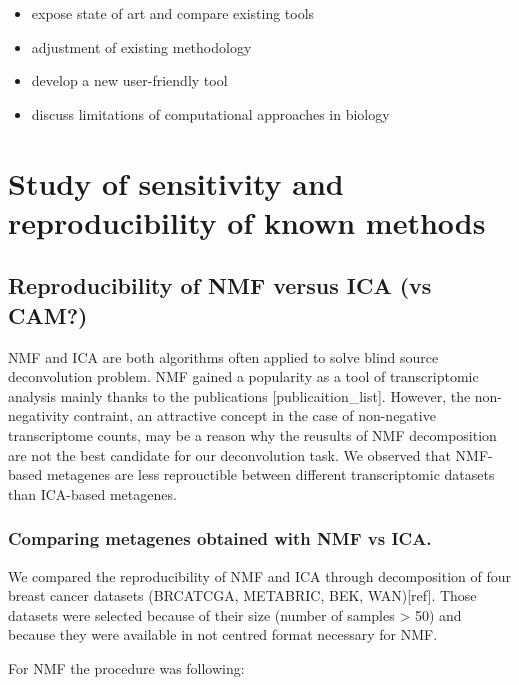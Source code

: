 \documentclass[12pt,]{book}
\providecommand{\tightlist}{%
  \setlength{\itemsep}{0pt}\setlength{\parskip}{0pt}}
\theoremstyle{definition}
\theoremstyle{definition}
\theoremstyle{definition}
\theoremstyle{remark}
\begin{document}
\begin{itemize}
\tightlist
\item
  expose state of art and compare existing tools
\item
  adjustment of existing methodology
\item
  develop a new user-friendly tool
\item
  discuss limitations of computational approaches in biology
\end{itemize}

\hypertarget{sens}{%
\chapter{Study of sensitivity and reproducibility of known
methods}\label{sens}}

\hypertarget{reproducibility-of-nmf-versus-ica-vs-cam}{%
\section{Reproducibility of NMF versus ICA (vs
CAM?)}\label{reproducibility-of-nmf-versus-ica-vs-cam}}

NMF and ICA are both algorithms often applied to solve blind source
deconvolution problem. NMF gained a popularity as a tool of
transcriptomic analysis mainly thanks to the publications
{[}publicaition\_list{]}. However, the non-negativity contraint, an
attractive concept in the case of non-negative transcriptome counts, may
be a reason why the reusults of NMF decomposition are not the best
candidate for our deconvolution task. We observed that NMF-based
metagenes are less reprouctible between different transcriptomic
datasets than ICA-based metagenes.

\hypertarget{comparing-metagenes-obtained-with-nmf-vs-ica.}{%
\subsection{Comparing metagenes obtained with NMF vs
ICA.}\label{comparing-metagenes-obtained-with-nmf-vs-ica.}}

We compared the reproducibility of NMF and ICA through decomposition of
four breast cancer datasets (BRCATCGA, METABRIC, BEK, WAN){[}ref{]}.
Those datasets were selected because of their size (number of samples
\textgreater{} 50) and because they were available in not centred format
necessary for NMF.

For NMF the procedure was following:
\end{document}
